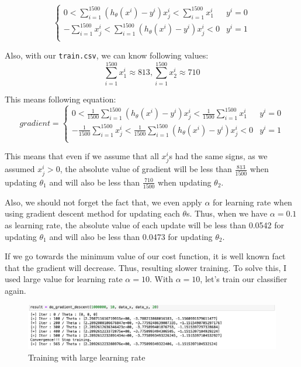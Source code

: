 \documentclass{homework}
\begin{document}
\[
    \begin{cases}
    0 < \sum_{i=1}^{1500}(h_\theta(x^i) -y^i)x_j^i < \sum_{i=1}^{1500}x_1^i &\text{$y^i = 0$} \\
     - \sum_{i=1}^{1500}x_j^i < \sum_{i=1}^{1500}(h_\theta(x^i) -y^i)x_j^i < 0 &\text{$y^i = 1$}\\
    \end{cases}
\]

Also, with our \texttt{train.csv}, we can know following values:
\[
    \sum_{i=1}^{1500}x_1^i \approx 813, \sum_{i=1}^{1500}x_2^i \approx 710
\]

This means following equation:
\[
    gradient = \begin{cases}
    0 < \frac{1}{1500} \sum_{i=1}^{1500}(h_\theta(x^i) -y^i)x_j^i < \frac{1}{1500} \sum_{i=1}^{1500}x_1^i &\text{$y^i = 0$} \\
     - \frac{1}{1500} \sum_{i=1}^{1500}x_j^i < \frac{1}{1500} \sum_{i=1}^{1500}(h_\theta(x^i) -y^i)x_j^i < 0 &\text{$y^i = 1$}\\
    \end{cases}
\]

This means that even if we assume that all $x_j^i$s had the same signs, as we assumed $x_j^i > 0$, the absolute value of gradient will be less than $\frac{813}{1500}$ when updating $\theta_1$ and will also be less than $\frac{710}{1500}$ when updating $\theta_2$. 

Also, we should not forget the fact that, we even apply $\alpha$ for learning rate when using gradient descent method for updating each $\theta$s. Thus, when we have $\alpha=0.1$ as learning rate, the absolute value of each update will be less than 0.0542 for updating $\theta_1$ and will also be less than 0.0473 for updating $\theta_2$. 

If we go towards the minimum value of our cost function, it is well known fact that the gradient will decrease. Thus, resulting slower training. To solve this, I used large value for learning rate $\alpha=10$. With $\alpha=10$, let's train our classifier again. 

\begin{figure}[h]
    \centering
    \includegraphics[width=15cm]{ml_2_4.png}
    \caption{Training with large learning rate}
    \label{fig:galaxy}
\end{figure}
\end{document}
